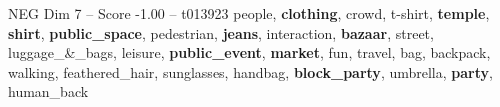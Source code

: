 \begin{textsample}{NEG Dim 7 – Score -1.00 – t013923}  \label{ex:f7_neg_009}
people, \textbf{clothing}, crowd, t-shirt, \textbf{temple}, \textbf{shirt}, \textbf{public\_space}, pedestrian, \textbf{jeans}, interaction, \textbf{bazaar}, street, luggage\_\&\_bags, leisure, \textbf{public\_event}, \textbf{market}, fun, travel, bag, backpack, walking, feathered\_hair, sunglasses, handbag, \textbf{block\_party}, umbrella, \textbf{party}, human\_back

\end{textsample}
